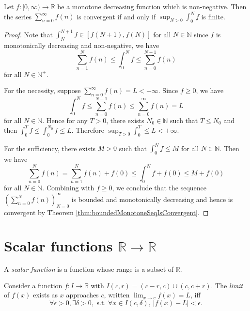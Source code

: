\begin{thm}
  \label{thm:integralTest}
  Let $f:[0, \infty)\rightarrow \mathbb{R}$
   be a monotone decreasing function 
   which is non-negative.
  Then the series $\sum_{n=0}^{\infty}f(n)$ is convergent if and only if
   $\sup_{N>0}\int_0^N f$ is finite.
\end{thm}
\begin{proof}
  Note that $\int_{N}^{N+1}f\in [f(N+1),f(N)]$ for all $N\in \mathbb{N}$
  since $f$ is monotonically decreasing and non-negative, we have
  \begin{displaymath}
    \sum_{n=1}^{N}f(n)\le \int_{0}^{N}f \le \sum_{n=0}^{N-1}f(n)
  \end{displaymath}
  for all $N\in \mathbb{N}^{+}$.
  
  For the necessity, suppose $\sum_{n=0}^{\infty}f(n)=L<+\infty$.
  Since $f\ge 0$, we have
  \begin{displaymath}
    \int_{0}^{N}f\le\sum_{n=0}^{N-1}f(n)\le\sum_{n=0}^{\infty}f(n)=L
  \end{displaymath}
  for all $N\in \mathbb{N}$.
  Hence for any $T>0$, there exists $N_{0}\in \mathbb{N}$ such that
  $T\le N_{0}$ and then $\int_{0}^{T}f\le \int_{0}^{N_{0}}f\le L$.
  Therefore $\sup_{T> 0}\int_{0}^{T}\le L <+\infty$.

  For the sufficiency, there exists $M>0$ such that
  $\int_{0}^{N}f\le M$ for all $N\in \mathbb{N}$.
  Then we have
  \begin{displaymath}
    \sum_{n=0}^{N}f(n)=\sum_{n=1}^{N}f(n)+f(0)
    \le \int_{0}^{N}f+f(0)
    \le M+f(0)
  \end{displaymath}
  for all $N\in \mathbb{N}$.
  Combining with $f\ge 0$, we conclude that
  the sequence $(\sum_{n=0}^{N}f(n))_{N=0}^{\infty}$
  is bounded and monotonically decreasing and hence is convergent
  by Theorem \ref{thm:boundedMonotoneSeqIsConvergent}.
\end{proof}

\section{Scalar functions
  $\mathbb{R}\rightarrow\mathbb{R}$}
\label{sec:cont-funct-on-R}

\begin{defn}
  A \emph{scalar function} is a function
   whose range is a subset of $\mathbb{R}$.
\end{defn}

\begin{defn}
  \label{def:limitOfAScalarFunc}
  Consider a function $f: I\rightarrow \mathbb{R}$
   with $I(c,r)=(c-r,c)\cup (c,c+r)$.
  The \emph{limit} of $f(x)$  exists
   as $x$ approaches $c$, written
     $\lim_{x\rightarrow c} f(x) = L$,
  iff 
  \begin{equation}
 \forall \epsilon>0, \exists \delta>0, \text{ s.t. }
    \forall x\in I(c,\delta),\ |f(x)-L|<\epsilon.
  \end{equation}
\end{defn}


